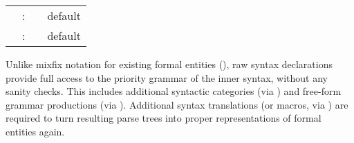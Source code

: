 \begin{isabellebody}
\begin{isamarkuptext}
\begin{tabular}{rcll}
    \indexdef{}{attribute}{syntax\_ast\_trace}\hypertarget{attribute.syntax-ast-trace}{\hyperlink{attribute.syntax-ast-trace}{\mbox{\isa{syntax{\isaliteral{5F}{\isacharunderscore}}ast{\isaliteral{5F}{\isacharunderscore}}trace}}}} & : & \isa{attribute} & default \isa{false} \\
    \indexdef{}{attribute}{syntax\_ast\_stats}\hypertarget{attribute.syntax-ast-stats}{\hyperlink{attribute.syntax-ast-stats}{\mbox{\isa{syntax{\isaliteral{5F}{\isacharunderscore}}ast{\isaliteral{5F}{\isacharunderscore}}stats}}}} & : & \isa{attribute} & default \isa{false} \\
  \end{tabular}

  Unlike mixfix notation for existing formal entities
  (), raw syntax declarations provide full access
  to the priority grammar of the inner syntax, without any sanity
  checks.  This includes additional syntactic categories (via
  \hyperlink{command.nonterminal}{\mbox{}}) and free-form grammar productions (via
  \hyperlink{command.syntax}{\mbox{}}).  Additional syntax translations (or macros, via
  \hyperlink{command.translations}{\mbox{}}) are required to turn resulting parse trees
  into proper representations of formal entities again.


\end{isamarkuptext}
\end{isabellebody}
